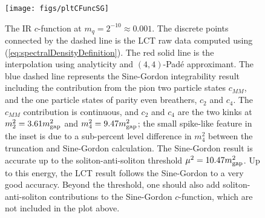 \documentclass[12pt]{article}
\begin{document}
\begin{figure}[htbp]
\centering
\texttt{[image: figs/pltCFuncSG]}
\caption{
    \label{fig:pltCFuncSG} 
    The IR $c$-function at $m_q = 2^{-10}\approx0.001$. The discrete points connected by the dashed line is the LCT raw data computed using (\ref{eq:spectralDensityDefinition}). The red solid line is the interpolation using analyticity and $(4,4)$-Pad\'e approximant. The blue dashed line represents the Sine-Gordon integrability result including the contribution from the pion two particle states $c_{MM}$, and the one particle states of parity even breathers, $c_2$ and $c_4$. The $c_{MM}$ contribution is continuous, and $c_2$ and $c_4$ are the two kinks at $m_2^2=3.61 m_{\rm gap}^2$ and $m_4^2=9.47 m_{\rm gap}^2$; the small spike-like feature in the inset is due to a sub-percent level difference in $m_4^2$ between the truncation and Sine-Gordon calculation. The Sine-Gordon result is accurate up to the soliton-anti-soliton threshold $\mu^2=10.47 m_{\rm gap}^2$. Up to this energy, the LCT result follows the Sine-Gordon to a very good accuracy. Beyond the threshold, one should also add soliton-anti-soliton contributions to the Sine-Gordon $c$-function, which are not included in the plot above.
}
\end{figure}
\end{document}
